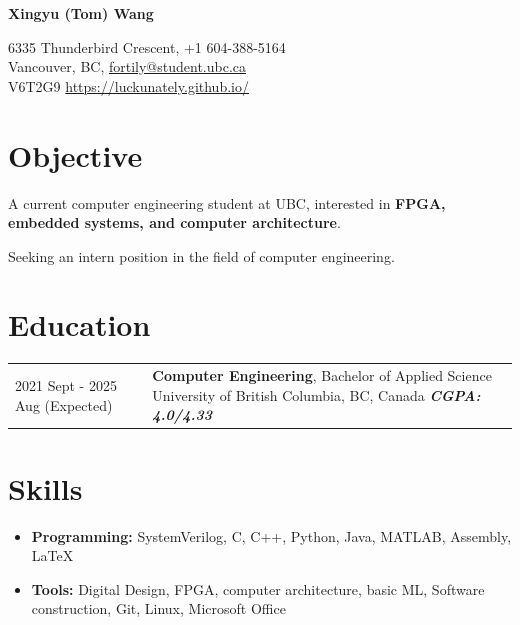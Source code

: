 \documentclass[12pt]{article}
\begin{document}
\begin{center}
     \Huge{\textbf{{Xingyu (Tom) Wang}}}
\end{center}
6335 Thunderbird Crescent, \hfill +1 604-388-5164\\
Vancouver, BC, \hfill \href{mailto:fortily@student.ubc.ca }{fortily@student.ubc.ca } \\ 
V6T2G9 \hfill \url{https://luckunately.github.io/}

\section{Objective}
A current computer engineering student at UBC, interested in \textbf{FPGA, embedded systems, and computer architecture}. 

Seeking an intern position in the field of computer engineering.


\section{Education}
\begin{tabular}{ l p{15in} }
    2021 Sept - 2025 Aug (Expected) & \textbf{Computer Engineering}, Bachelor of Applied Science \newline University of British Columbia, BC, Canada \newline \textbf{\textit{CGPA: 4.0/4.33}} \\ 
\end{tabular}

\section{Skills}
\begin{itemize}
    \itemsep=-.3em
    \item \textbf{Programming:} SystemVerilog, C, C++, Python, Java, MATLAB, Assembly, \LaTeX
    \item \textbf{Tools:} Digital Design, FPGA, computer architecture, basic ML, Software construction, Git, Linux, Microsoft Office
\end{itemize}
\end{document}
